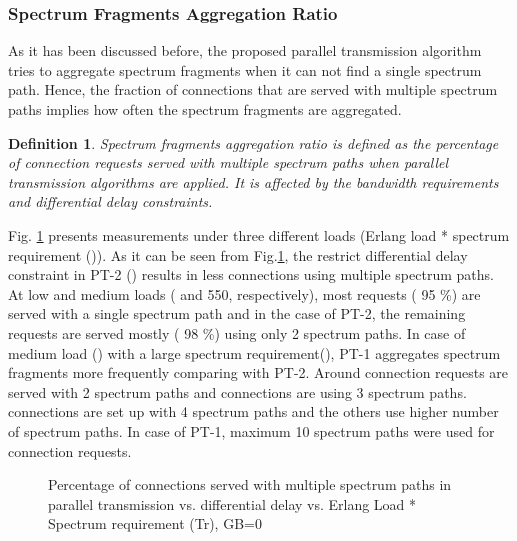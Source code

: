 \documentclass[conference]{IEEEtran}
\newtheorem{definition}{Definition}
\begin{document}
\subsubsection{Spectrum Fragments Aggregation Ratio}
As it has been discussed before, the proposed parallel transmission algorithm tries to aggregate spectrum fragments 
when it can not find a single spectrum path.  Hence, the fraction of connections that are served with multiple spectrum paths implies how often the spectrum fragments are aggregated.  
\begin{definition}
\emph{Spectrum fragments aggregation ratio} is defined as the percentage of connection requests served with multiple spectrum paths when parallel transmission algorithms are applied. It is affected by the bandwidth requirements and differential delay constraints.  
\end{definition}
Fig. \ref{resfigMPPercent} presents measurements under three different loads (Erlang load * spectrum requirement ()). 
As it can be seen from Fig.\ref{resfigMPPercent}, the restrict differential delay constraint in PT-2 () results in less connections using multiple spectrum paths. At low and medium loads ( and 550, respectively),  most requests ( 95 \%) are served with a single spectrum path and in the case of PT-2, the remaining requests are served mostly ( 98 \%) using only 2 spectrum paths. In case of medium load () with a large spectrum requirement(),  PT-1 aggregates spectrum fragments more frequently comparing with PT-2. Around  connection requests are served with 2 spectrum paths and    connections are using 3 spectrum paths.   connections are set up with  4 spectrum paths and the others use   higher number of spectrum paths. In case of PT-1, maximum 10 spectrum paths were used for connection requests. 

\begin{figure}
 \caption{Percentage of connections served with multiple spectrum paths in parallel transmission vs. differential delay vs. Erlang Load * Spectrum requirement (Tr), GB=0}
\label{resfigMPPercent}\vspace{-0.3cm}
\end{figure}
\end{document}
